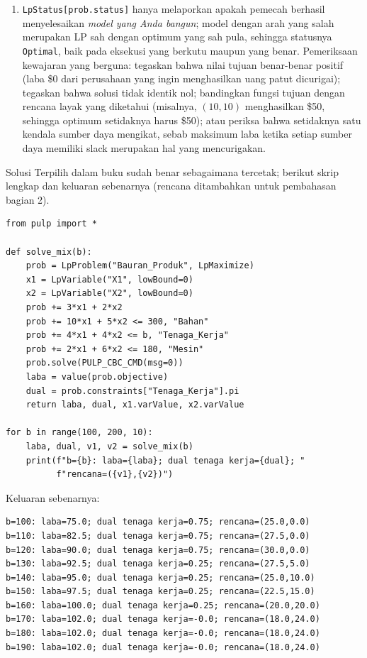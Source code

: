 \begin{enumerate}
\item \texttt{LpStatus[prob.status]} hanya melaporkan apakah pemecah berhasil
menyelesaikan \emph{model yang Anda bangun}; model dengan arah yang salah
merupakan LP sah dengan optimum yang sah pula, sehingga statusnya
\texttt{Optimal}, baik pada eksekusi yang berkutu maupun yang benar.
Pemeriksaan kewajaran yang berguna: tegaskan bahwa nilai tujuan benar-benar
positif (laba \$0 dari perusahaan yang ingin menghasilkan uang patut
dicurigai); tegaskan bahwa solusi tidak identik nol; bandingkan fungsi tujuan
dengan rencana layak yang diketahui (misalnya, $(10,10)$ menghasilkan \$50,
sehingga optimum setidaknya harus \$50); atau periksa bahwa setidaknya satu
kendala sumber daya mengikat, sebab maksimum laba ketika setiap sumber daya
memiliki slack merupakan hal yang mencurigakan.
\end{enumerate}


Solusi Terpilih dalam buku sudah benar sebagaimana tercetak; berikut skrip
lengkap dan keluaran sebenarnya (rencana ditambahkan untuk pembahasan bagian 2).

\begin{verbatim}
from pulp import *

def solve_mix(b):
    prob = LpProblem("Bauran_Produk", LpMaximize)
    x1 = LpVariable("X1", lowBound=0)
    x2 = LpVariable("X2", lowBound=0)
    prob += 3*x1 + 2*x2
    prob += 10*x1 + 5*x2 <= 300, "Bahan"
    prob += 4*x1 + 4*x2 <= b, "Tenaga_Kerja"
    prob += 2*x1 + 6*x2 <= 180, "Mesin"
    prob.solve(PULP_CBC_CMD(msg=0))
    laba = value(prob.objective)
    dual = prob.constraints["Tenaga_Kerja"].pi
    return laba, dual, x1.varValue, x2.varValue

for b in range(100, 200, 10):
    laba, dual, v1, v2 = solve_mix(b)
    print(f"b={b}: laba={laba}; dual tenaga kerja={dual}; "
          f"rencana=({v1},{v2})")
\end{verbatim}

Keluaran sebenarnya:

\begin{verbatim}
b=100: laba=75.0; dual tenaga kerja=0.75; rencana=(25.0,0.0)
b=110: laba=82.5; dual tenaga kerja=0.75; rencana=(27.5,0.0)
b=120: laba=90.0; dual tenaga kerja=0.75; rencana=(30.0,0.0)
b=130: laba=92.5; dual tenaga kerja=0.25; rencana=(27.5,5.0)
b=140: laba=95.0; dual tenaga kerja=0.25; rencana=(25.0,10.0)
b=150: laba=97.5; dual tenaga kerja=0.25; rencana=(22.5,15.0)
b=160: laba=100.0; dual tenaga kerja=0.25; rencana=(20.0,20.0)
b=170: laba=102.0; dual tenaga kerja=-0.0; rencana=(18.0,24.0)
b=180: laba=102.0; dual tenaga kerja=-0.0; rencana=(18.0,24.0)
b=190: laba=102.0; dual tenaga kerja=-0.0; rencana=(18.0,24.0)
\end{verbatim}

